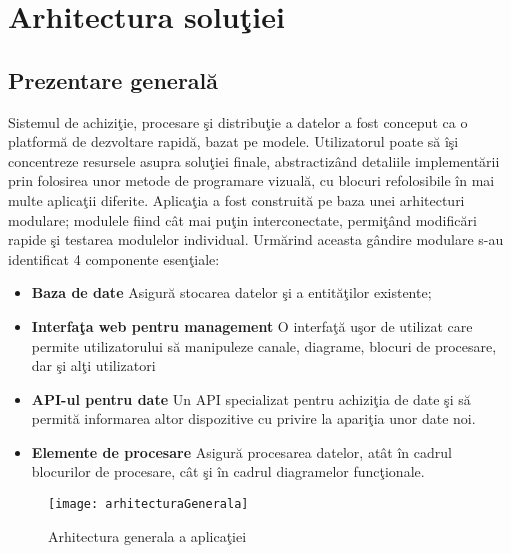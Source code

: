 \chapter{Arhitectura soluţiei}
\label{chapter:arhitecture}

\section{Prezentare generală}
Sistemul de achiziţie, procesare şi distribuţie a datelor a fost conceput ca o platformă de dezvoltare rapidă, bazat pe modele. Utilizatorul poate să îşi concentreze resursele asupra soluţiei finale, abstractizând detaliile implementării prin folosirea unor metode de programare vizuală, cu blocuri refolosibile în mai multe aplicaţii diferite. 
Aplicaţia a fost construită pe baza unei arhitecturi modulare; modulele fiind cât mai puţin interconectate, permiţând modificări rapide şi testarea modulelor individual. Urmărind aceasta gândire modulare s-au identificat 4 componente esenţiale: 
\begin{itemize}
	\item \textbf{Baza de date} Asigură stocarea datelor şi a entităţilor existente;
	\item \textbf{Interfaţa web pentru management} O interfaţă uşor de utilizat care permite  utilizatorului să manipuleze canale, diagrame, blocuri de procesare, dar şi alţi utilizatori
	\item \textbf{API-ul pentru date} Un API specializat pentru achiziţia de  date şi să permită informarea altor dispozitive cu privire la apariţia unor date noi.
	\item \textbf{Elemente de procesare} Asigură procesarea datelor, atât în cadrul blocurilor de procesare, cât şi în cadrul diagramelor funcţionale.
\end{itemize}
\begin{figure}
	\centering
	\texttt{[image: arhitecturaGenerala]}
	\caption{Arhitectura generala a aplicaţiei}
	\label{fig:arhitecture}
\end{figure}

